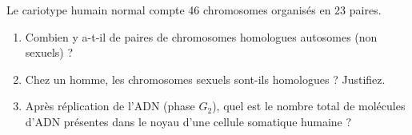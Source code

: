 \documentclass[11pt]{article}
\begin{document}
\begin{exercice}
Le cariotype humain normal compte 46 chromosomes organisés en 23 paires.
\begin{enumerate}
    \item Combien y a-t-il de paires de chromosomes homologues autosomes (non sexuels) ?
    \item Chez un homme, les chromosomes sexuels sont-ils homologues ? Justifiez.
    \item Après réplication de l'ADN (phase $G_2$), quel est le nombre total de molécules d'ADN présentes dans le noyau d'une cellule somatique humaine ?
\end{enumerate}
\end{exercice}
\end{document}
